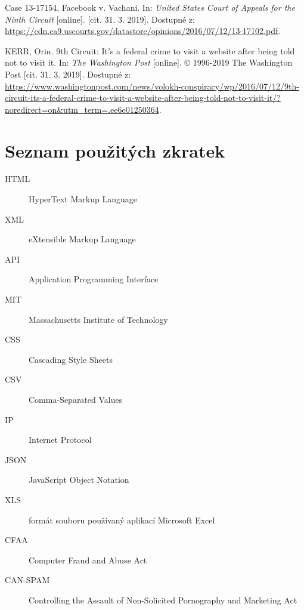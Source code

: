\documentclass[thesis=B,czech]{FITthesis}[2012/06/26]
\begin{document}
\begin{thebibliography}{99}
	Case 13-17154, Facebook v. Vachani. In: \textit{United States Court of Appeals for the Ninth Circuit} [online]. [cit. 31. 3. 2019]. Dostupné z: \url{https://cdn.ca9.uscourts.gov/datastore/opinions/2016/07/12/13-17102.pdf}.
	
	KERR, Orin. 9th Circuit: It’s a federal crime to visit a website after being told not to visit it. In: \textit{The Washington Post} [online]. © 1996-2019 The Washington Post [cit. 31. 3. 2019]. Dostupné z: \url{https://www.washingtonpost.com/news/volokh-conspiracy/wp/2016/07/12/9th-circuit-its-a-federal-crime-to-visit-a-website-after-being-told-not-to-visit-it/?noredirect=on\&utm_term=.ee6e01250364}.
\end{thebibliography}

\appendix




\chapter{Seznam použitých zkratek}
\begin{description}
	\item[HTML] HyperText Markup Language
	\item[XML] eXtensible Markup Language
	\item[API] Application Programming Interface
	\item[MIT] Massachusetts Institute of Technology
	\item[CSS] Cascading Style Sheets
	\item[CSV] Comma-Separated Values
	\item[IP] Internet Protocol
	\item[JSON] JavaScript Object Notation
	\item[XLS] formát souboru používaný aplikací Microsoft Excel
	\item[CFAA] Computer Fraud and Abuse Act
	\item[CAN-SPAM] Controlling the Assault of Non-Solicited Pornography and Marketing Act
\end{description}
\end{document}
